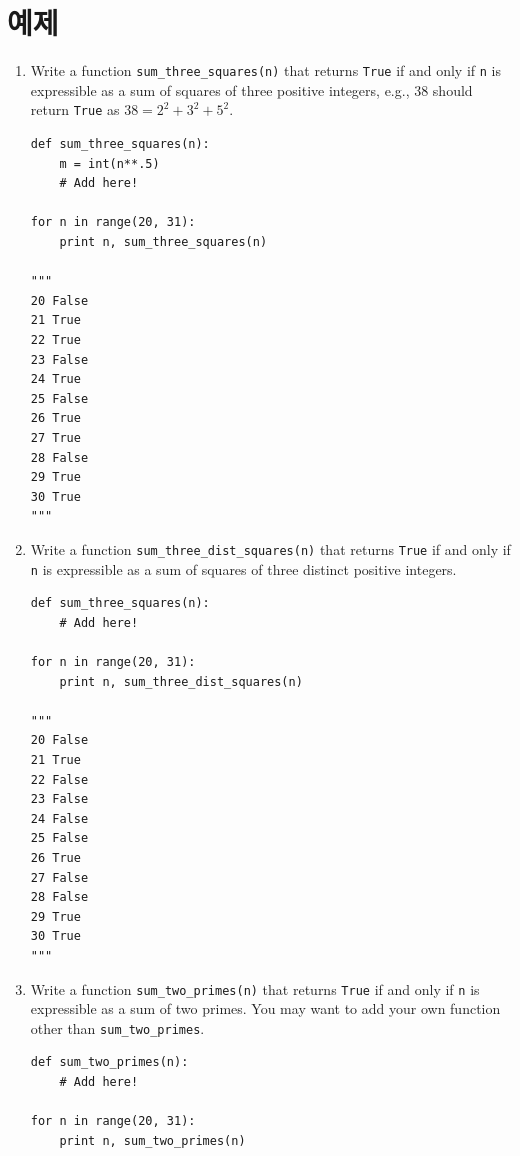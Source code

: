 \documentclass[../main.tex]{subfiles}
\begin{document}
\section{예제}
\begin{enumerate}
\item Write a function \texttt{sum\_three\_squares(n)} that returns \texttt{True} if and only if \texttt{n} is expressible as a sum of squares of three positive integers, e.g., 38 should return \texttt{True} as $38 = 2^2 + 3^2 + 5^2$.
\begin{verbatim}
def sum_three_squares(n):
    m = int(n**.5)
    # Add here!
    
for n in range(20, 31):
    print n, sum_three_squares(n)

"""
20 False
21 True
22 True
23 False
24 True
25 False
26 True
27 True
28 False
29 True
30 True
"""
\end{verbatim}

\item Write a function \texttt{sum\_three\_dist\_squares(n)} that returns \texttt{True} if and only if \texttt{n} is expressible as a sum of squares of three distinct positive integers.
\begin{verbatim}
def sum_three_squares(n):
    # Add here!
    
for n in range(20, 31):
    print n, sum_three_dist_squares(n)

"""
20 False
21 True
22 False
23 False
24 False
25 False
26 True
27 False
28 False
29 True
30 True
"""
\end{verbatim}

\item Write a function \texttt{sum\_two\_primes(n)} that returns \texttt{True} if and only if \texttt{n} is expressible as a sum of two primes.
You may want to add your own function other than \texttt{sum\_two\_primes}.
\begin{verbatim}
def sum_two_primes(n):
    # Add here!
    
for n in range(20, 31):
    print n, sum_two_primes(n)


\end{verbatim}
\end{enumerate}
\end{document}
